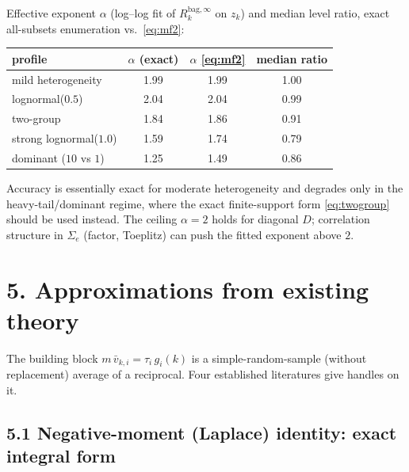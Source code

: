 \documentclass[11pt]{article}
\newcommand{\Sig}{\Sigma_e}
\newcommand{\Rk}{R_k^{\mathrm{bag},\infty}}
\begin{document}
Effective exponent $\alpha$ (log--log fit of $\Rk$ on $z_k$) and median level ratio,
exact all-subsets enumeration vs.\ \eqref{eq:mf2}:
\begin{center}
\begin{tabular}{lccc}
\hline
profile & $\alpha$ (exact) & $\alpha$ \eqref{eq:mf2} & median ratio \\
\hline
mild heterogeneity        & 1.99 & 1.99 & 1.00 \\
lognormal($0.5$)          & 2.04 & 2.04 & 0.99 \\
two-group                 & 1.84 & 1.86 & 0.91 \\
strong lognormal($1.0$)   & 1.59 & 1.74 & 0.79 \\
dominant ($10$ vs $1$)    & 1.25 & 1.49 & 0.86 \\
\hline
\end{tabular}
\end{center}
Accuracy is essentially exact for moderate heterogeneity and degrades only in the
heavy-tail/dominant regime, where the exact finite-support form \eqref{eq:twogroup}
should be used instead. The ceiling $\alpha=2$ holds for diagonal $D$; correlation
structure in $\Sig$ (factor, Toeplitz) can push the fitted exponent above $2$.

\section*{5. Approximations from existing theory}

The building block $m\,\bar v_{k,i}=\tau_i\,g_i(k)$ is a simple-random-sample (without
replacement) average of a reciprocal. Four established literatures give handles on it.

\subsection*{5.1 Negative-moment (Laplace) identity: exact integral form}
\end{document}
